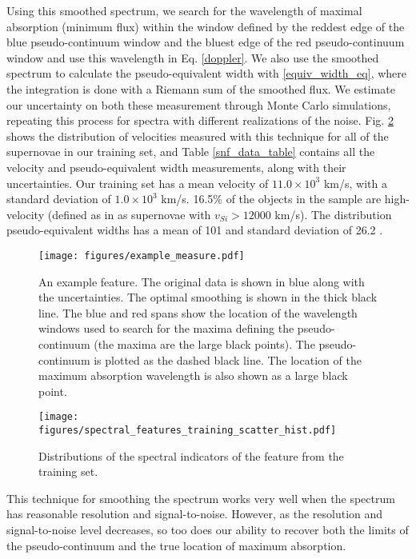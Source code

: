 Using this smoothed spectrum, we search for the wavelength of maximal absorption (minimum flux) within the window defined by the reddest edge of the blue pseudo-continuum window and the bluest edge of the red pseudo-continuum window and use this wavelength in Eq. \ref{doppler}. We also use the smoothed spectrum to calculate the pseudo-equivalent width with \ref{equiv_width_eq}, where the integration is done with a Riemann sum of the smoothed flux. We estimate our uncertainty on both these measurement through Monte Carlo simulations, repeating this process for spectra with different realizations of the noise. Fig. \ref{indicator_scatter_hist} shows the distribution of velocities measured with this technique for all of the supernovae in our training set, and Table \ref{snf_data_table} contains all the velocity and pseudo-equivalent width measurements, along with their uncertainties. Our training set has a mean velocity of $11.0 \times 10^3$ km/s, with a standard deviation of $1.0 \times 10^3$ km/s. 16.5\% of the objects in the sample are high-velocity (defined as in \cite{wang_evidence_2013} as supernovae with $v_{Si}>12000$ km/s). The distribution pseudo-equivalent widths has a mean of 101 \angstrom\; and standard deviation of 26.2 \angstrom.

\begin{figure}[!htb]
    \centering
    \texttt{[image: figures/example\_measure.pdf]}
    \caption{An example \siliconii\; feature. The original data is shown in blue along with the uncertainties. The optimal smoothing is shown in the thick black line. The blue and red spans show the location of the wavelength windows used to search for the maxima defining the pseudo-continuum (the maxima are the large black points). The pseudo-continuum is plotted as the dashed black line. The location of the maximum absorption wavelength is also shown as a large black point.}
    \label{smooth_example}
\end{figure}

\begin{figure}[!htb]
    \centering
    \texttt{[image: figures/spectral\_features\_training\_scatter\_hist.pdf]}
    \caption{Distributions of the spectral indicators of the \siliconii\; feature from the training set.}
    \label{indicator_scatter_hist}
\end{figure}



This technique for smoothing the spectrum works very well when the spectrum has reasonable resolution and signal-to-noise. However, as the resolution and signal-to-noise level decreases, so too does our ability to recover both the limits of the pseudo-continuum and the true location of maximum absorption. 

